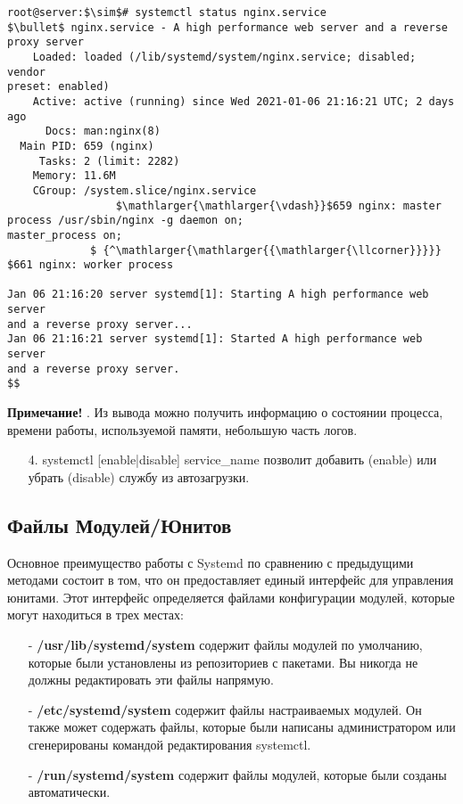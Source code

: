 \documentclass[14pt, a4paper]{article}
\begin{document}
\begin{lstlisting}
root@server:$\sim$# systemctl status nginx.service
$\bullet$ nginx.service - A high performance web server and a reverse proxy server
    Loaded: loaded (/lib/systemd/system/nginx.service; disabled; vendor 
preset: enabled)
    Active: active (running) since Wed 2021-01-06 21:16:21 UTC; 2 days ago
      Docs: man:nginx(8)
  Main PID: 659 (nginx)
     Tasks: 2 (limit: 2282)
    Memory: 11.6M
    CGroup: /system.slice/nginx.service
                 $\mathlarger{\mathlarger{\vdash}}$659 nginx: master process /usr/sbin/nginx -g daemon on;
master_process on;
             $ {^\mathlarger{\mathlarger{{\mathlarger{\llcorner}}}}} $661 nginx: worker process

Jan 06 21:16:20 server systemd[1]: Starting A high performance web server 
and a reverse proxy server...
Jan 06 21:16:21 server systemd[1]: Started A high performance web server 
and a reverse proxy server.
$$
\end{lstlisting}

\vspace{0.2cm}

\noindent \textbf{Примечание!} . Из вывода можно
получить информацию о состоянии процесса, времени работы, используемой памяти,
небольшую часть логов.

\begin{enumerate}
    \item[4.] \colorbox{backcolour}{systemctl [enable|disable] service\_name} позволит добавить (enable) или убрать
    (disable) службу из автозагрузки.
\end{enumerate}

\subsection*{Файлы Модулей/Юнитов} 

Основное преимущество работы с Systemd по сравнению с предыдущими методами состоит в том,
что он предоставляет единый интерфейс для управления юнитами. Этот интерфейс определяется
файлами конфигурации модулей, которые могут находиться в трех местах:

\begin{itemize}
    \item[-] \textbf{/usr/lib/systemd/system} содержит файлы модулей по умолчанию, которые были установлены
    из репозиториев с пакетами. Вы никогда не должны редактировать эти файлы напрямую.
    \item[-] \textbf{/etc/systemd/system} содержит файлы настраиваемых модулей. Он также может содержать
    файлы, которые были написаны администратором или сгенерированы командой
    редактирования systemctl.
    \item[-] \textbf{/run/systemd/system} содержит файлы модулей, которые были созданы автоматически.
\end{itemize}
\end{document}
